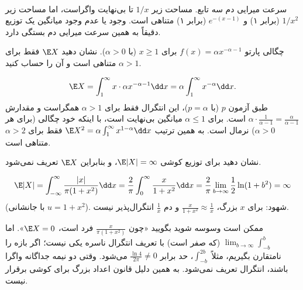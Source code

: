 \begin{center}
\begin{tikzpicture}
\end{tikzpicture}\\
{\small سرعت میرایی دم سه تابع. مساحت زیر $1/x$ تا بی‌نهایت واگراست، اما مساحت زیر $1/x^2$ (برابر ۱) و $e^{-(x-1)}$ (برابر ۱) متناهی است. وجود یا عدم وجود میانگین یک توزیع دقیقاً به همین سرعت میرایی دم بستگی دارد.}
\end{center}

\begin{example}
چگالی پارتو $f(x)=\alpha x^{-\alpha-1}$ برای $x\ge1$ (با $\alpha>0$). نشان دهید $\E X$ فقط برای $\alpha>1$ متناهی است و آن را حساب کنید.
\begin{solution}
\[
\E X=\int_1^\infty x\cdot\alpha x^{-\alpha-1}\dd x=\alpha\int_1^\infty x^{-\alpha}\dd x .
\]
طبق آزمون $p$ (با $p=\alpha$)، این انتگرال فقط برای $\alpha>1$ همگراست و مقدارش $\alpha\cdot\frac{1}{\alpha-1}=\frac{\alpha}{\alpha-1}$ است. برای $\alpha\le1$ میانگین بی‌نهایت است، با اینکه خود چگالی (برای هر $\alpha>0$) نرمال است. به همین ترتیب $\E X^2=\alpha\int_1^\infty x^{1-\alpha}\dd x$ فقط برای $\alpha>2$ متناهی است.
\end{solution}
\end{example}

\begin{example}
نشان دهید برای توزیع کوشی $\E|X|=\infty$، و بنابراین $\E X$ تعریف نمی‌شود.
\begin{solution}
\[
\E|X|=\int_{-\infty}^\infty\frac{|x|}{\pi(1+x^2)}\dd x=\frac2\pi\int_0^\infty\frac{x}{1+x^2}\dd x=\frac2\pi\lim_{b\to\infty}\frac12\ln(1+b^2)=\infty
\]
(با جانشانی $u=1+x^2$). شهود: برای $x$ بزرگ، $\frac{x}{1+x^2}\approx\frac1x$ و دم $\frac1x$ انتگرال‌پذیر نیست.
\end{solution}
\end{example}

\begin{warning}
\warntitle ممکن است وسوسه شوید بگویید «چون $\frac{x}{\pi(1+x^2)}$ فرد است، $\E X=0$». اما $\lim_{b\to\infty}\int_{-b}^{b}$ (که صفر است) با تعریف انتگرال ناسره یکی نیست؛ اگر بازه را نامتقارن بگیریم، مثلاً $\int_{-b}^{2b}$، حد برابر $\frac{\ln4}{2\pi}\neq0$ می‌شود. وقتی دو نیمه جداگانه واگرا باشند، انتگرال تعریف نمی‌شود. به همین دلیل قانون اعداد بزرگ برای کوشی برقرار نیست.
\end{warning}

